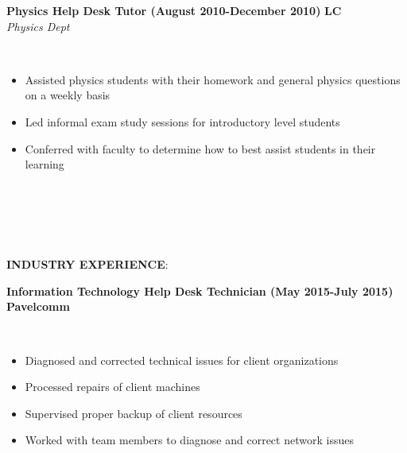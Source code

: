 \documentclass{article}
\begin{document}
%
%
%
%
\begin{vwcol}[widths={0.8,0.2}, sep=.8cm, justify=flush, rule=0pt, indent=0em]
\noindent \textbf{Physics Help Desk Tutor (August 2010-December 2010)}
\newpage
\noindent \textbf{LC}\\
\noindent \emph{Physics Dept}
\end{vwcol}
\phantom \\
\begin{itemize}
\item Assisted physics students with their homework and general physics questions on a weekly basis
\item Led informal exam study sessions for introductory level students
\item Conferred with faculty to determine how to best assist students in their learning
\end{itemize}
\phantom \\
\phantom \\
%
%
%
%
\par
\phantom \\
\phantom \\
\noindent \textbf{INDUSTRY EXPERIENCE}:\\
\begin{vwcol}[widths={0.8,0.2}, sep=.8cm, justify=flush, rule=0pt, indent=0em]
\noindent \textbf{Information Technology Help Desk Technician (May 2015-July 2015)}
\newpage
\noindent \textbf{Pavelcomm}
\end{vwcol}
\phantom \\
\begin{itemize}
\item Diagnosed and corrected technical issues for client organizations
\item Processed repairs of client machines
\item Supervised proper backup of client resources
\item Worked with team members to diagnose and correct network issues
\end{itemize}
\end{document}
